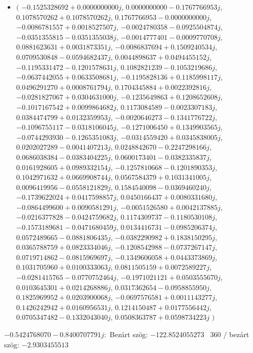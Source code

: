 \documentclass[14pt,a4paper]{article}
\begin{document}
\begin{itemize}
\item
$\big($
$-0.1525328692+0.0000000000j$, $0.0000000000-0.1767766953j$, $0.1078570262+0.1078570262j$, $0.1767766953-0.0000000000j$, $-0.0086781557+0.0018527507j$, $-0.0024780358-0.0925504874j$, $-0.0351355815-0.0351355038j$, $-0.0014777401-0.0009770708j$, $0.0881623631+0.0031873351j$, $-0.0086837694+0.1509240534j$, $0.0709530848-0.0594682437j$, $0.0044898637+0.0494455152j$, $-0.1195331472-0.1201578631j$, $0.1082821239-0.1053219686j$, $-0.0637442055+0.0633508681j$, $-0.1195828136+0.1185998117j$, $0.0496291270+0.0008761794j$, $0.1704345884+0.0022392816j$, $-0.0281827067+0.0304631000j$, $-0.1235649863+0.1208652608j$, $-0.1017167542+0.0099864682j$, $0.1173084589-0.0023307183j$, $0.0384474799+0.0132359953j$, $-0.0020646273-0.1341776722j$, $-0.1096755117-0.0318106045j$, $-0.1271006450+0.1349903565j$, $-0.0744293930-0.1265351083j$, $-0.0314559420+0.0345838005j$, $0.0202027289-0.0041407213j$, $0.0248842670-0.2247298166j$, $0.0686038384-0.0383404225j$, $0.0600173401-0.0382335837j$, $0.0161928605+0.0989332154j$, $-0.1257810668-0.1201890353j$, $0.1042971632+0.0669908744j$, $0.0567584379+0.1031341005j$, $0.0096419956-0.0558121829j$, $0.1584540098-0.0369460240j$, $-0.1739622024+0.0417598857j$, $0.0450166437+0.0080331680j$, $-0.0864499600+0.0090581291j$, $-0.0051526580+0.0042137885j$, $-0.0216377828-0.0424759682j$, $0.1174309737-0.1180530108j$, $-0.1573189681-0.0471680459j$, $0.0134416731-0.0985206374j$, $0.0572489665-0.0881806435j$, $-0.0382290982+0.1838150295j$, $0.0365788759+0.0823334046j$, $-0.1208542988-0.0737267147j$, $0.0719714862-0.0815969697j$, $-0.1349606058+0.0443373869j$, $0.1031705960+0.0100333063j$, $0.0811505159+0.0072589227j$, $-0.0281415765-0.0770752464j$, $-0.1971021121+0.0503555670j$, $0.0103645301+0.0214268886j$, $0.0317362654-0.0958855950j$, $0.1825969952+0.0203900068j$, $-0.0697576581+0.0011143277j$, $0.1426242942+0.0160956531j$, $0.1214150487+0.0177556442j$, $0.0705347482-0.1332043040j$, $0.0508363787+0.0598734223j$
$\big)$
\end{itemize}
$-0.5424768070-0.8400707791j$:\
Bezárt szög: $-122.8524055273$ \
360 / bezárt szög: $-2.9303455513$\
\end{document}
